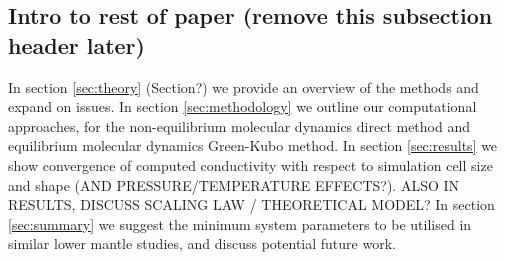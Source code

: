 \documentclass[%
preprint,                                  %
nofootinbib,
 amsmath,amssymb,
 aps,
]{revtex4-1}
\begin{document}










\subsection{\label{sec:intro.end}Intro to rest of paper (remove this subsection header later)}

In section \ref{sec:theory} (Section?) we provide an overview of the methods and expand on issues.
In section \ref{sec:methodology} we outline our computational approaches, for the non-equilibrium molecular dynamics direct method and equilibrium molecular dynamics Green-Kubo method. In section \ref{sec:results} we show convergence of computed conductivity with respect to simulation cell size and shape (AND PRESSURE/TEMPERATURE EFFECTS?). ALSO IN RESULTS, DISCUSS SCALING LAW / THEORETICAL MODEL?
In section \ref{sec:summary} we suggest the minimum system parameters to be utilised in similar lower mantle studies, and discuss potential future work. 
\end{document}
